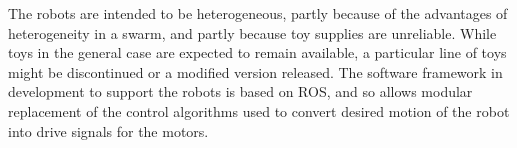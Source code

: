 The robots are intended to be heterogeneous, partly because of the advantages of heterogeneity in a swarm, and partly because toy supplies are unreliable.
While toys in the general case are expected to remain available, a particular line of toys might be discontinued or a modified version released. 
The software framework in development to support the robots is based on ROS, and so allows modular replacement of the control algorithms used to convert desired motion of the robot into drive signals for the motors. 


